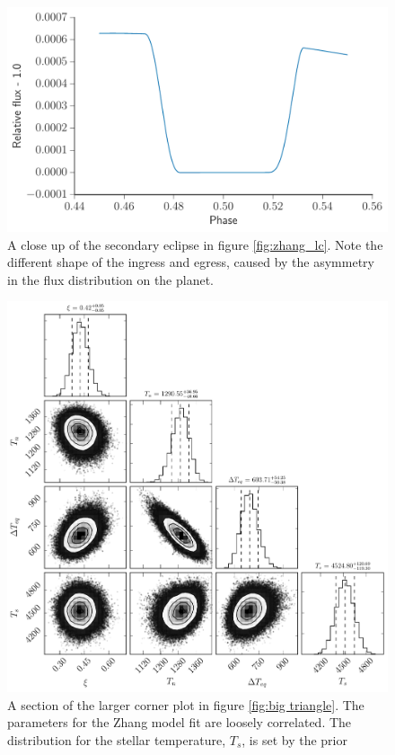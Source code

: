 \documentclass[a4paper,fleqn,usenatbib]{mnras}
\begin{document}
\begin{figure}
\begin{center}
\includegraphics[width=\columnwidth]{img/zhang_lc_zoom.pdf}
\caption{A close up of the secondary eclipse in figure \ref{fig:zhang_lc}. Note the different shape of the ingress and egress, caused by the asymmetry in the flux distribution on the planet.}
\label{fig:zhang_zoom}
\end{center}
\end{figure}

\begin{figure}
\begin{center}
\includegraphics[width=\columnwidth]{img/free_parameterstriangle.pdf}
\caption{A section of the larger corner plot in figure \ref{fig:big triangle}. The parameters for the Zhang model fit are loosely correlated. The distribution for the stellar temperature, $T_s$, is set by the prior}
\label{fig:triangle corner sub}
\end{center}
\end{figure}
\end{document}
